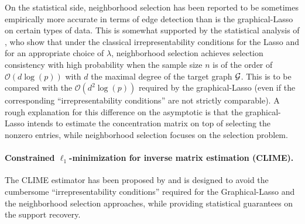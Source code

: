 On the statistical  side, neighborhood selection has  been reported to
be sometimes empirically more accurate in terms of edge detection than
is the graphical-Lasso \cite{2008_SAGM_Villers,2008_preprint_Rocha} on
certain types of data.  This  is somewhat supported by the statistical
analysis  of  \cite{2011_EJS_Ravikumar},  who   show  that  under  the
classical    irrepresentability     conditions    for     the    Lasso
\cite{2006_JMLR_Zhao,2006_AS_Meinshausen}   and  for   an  appropriate
choice  of   $\lambda$,  neighborhood  selection   achieves  selection
consistency with high  probability when the sample size $n$  is of the
order of  $\mathcal{O}(d\log(p))$ with $d$  the maximal degree  of the
target   graph  $\mathcal{G}$.    This   is  to   be   compared  with   the
$\mathcal{O}(d^2\log(p))$ required by the graphical-Lasso (even if the
corresponding  ``irrepresentability  conditions''   are  not  strictly
comparable).   A   rough  explanation  for  this   difference  on  the
asymptotic  is  that  the  graphical-Lasso  intends  to  estimate  the
concentration matrix  on top of  selecting the nonzero  entries, while
neighborhood selection focuses on the selection problem.

\paragraph*{Constrained   $\ell_1$-minimization  for   inverse  matrix
  estimation  (CLIME).}   The CLIME  estimator  has  been proposed  by
\cite{2011_AS_Cai}   and  is   designed   to   avoid  the   cumbersome
``irrepresentability conditions'' required for the Graphical-Lasso and
the  neighborhood selection  approaches,  while providing  statistical
guarantees on the support recovery.

